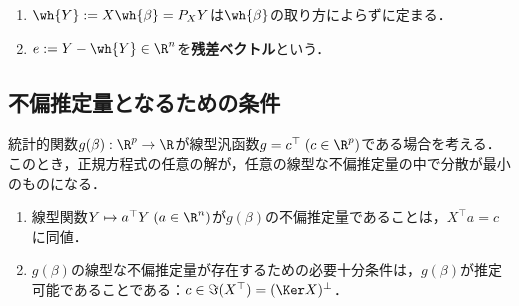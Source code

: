 \documentclass[uplatex,dvipdfmx]{jsreport}
\begin{document}
\begin{definition}\mbox{}
    \begin{enumerate}
        \item $\wh{Y}:=X\wh{\beta}=P_XY$は$\wh{\beta}$の取り方によらずに定まる．
        \item $e:=Y-\wh{Y}\in\R^n$を\textbf{残差ベクトル}という．
    \end{enumerate}
\end{definition}

\subsection{不偏推定量となるための条件}

\begin{tcolorbox}[colframe=ForestGreen, colback=ForestGreen!10!white,breakable,colbacktitle=ForestGreen!40!white,coltitle=black,fonttitle=\bfseries\sffamily,
title=]
    統計的関数$g(\beta):\R^p\to\R$が線型汎函数$g=c^\top\;(c\in\R^p)$である場合を考える．
    このとき，正規方程式の任意の解が，任意の線型な不偏推定量の中で分散が最小のものになる．
\end{tcolorbox}

\begin{theorem}[線型な不偏推定量の性質]\mbox{}
    \begin{enumerate}
        \item 線型関数$Y\mapsto a^\top Y\;(a\in\R^n)$が$g(\beta)$の不偏推定量であることは，$X^\top a=c$に同値．
        \item $g(\beta)$の線型な不偏推定量が存在するための必要十分条件は，$g(\beta)$が推定可能であることである：$c\in\Im(X^\top)=(\Ker X)^\perp$．
    \end{enumerate}
\end{theorem}
\end{document}
